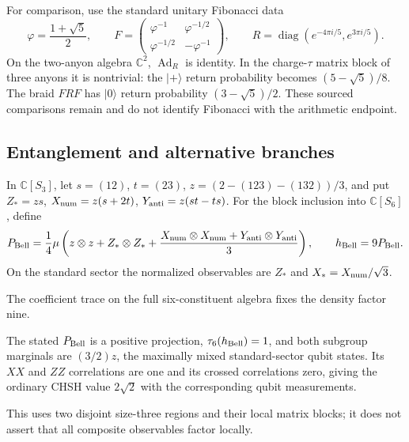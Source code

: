 For comparison, use the standard unitary Fibonacci data
\[
\varphi=\frac{1+\sqrt5}{2},\qquad
F=\begin{pmatrix}\varphi^{-1}&\varphi^{-1/2}\\
\varphi^{-1/2}&-\varphi^{-1}\end{pmatrix},\qquad
R=\operatorname{diag}(e^{-4\pi i/5},e^{3\pi i/5}).
\]
On the two-anyon algebra $\mathbb C^2$, $\operatorname{Ad}_R$ is identity.
In the charge-$\tau$ matrix block of three anyons it is nontrivial:
the $|+\rangle$ return probability becomes $(5-\sqrt5)/8$.
The braid $FRF$ has $|0\rangle$ return probability $(3-\sqrt5)/2$.
These sourced comparisons remain \statusSketch{} and do not identify
Fibonacci with the arithmetic endpoint.

\subsection{Entanglement and alternative branches}

\begin{definition}
In $\mathbb C[S_3]$, let $s=(12)$, $t=(23)$,
$z=(2-(123)-(132))/3$, and put
$Z_*=zs$, $X_{\rm num}=z(s+2t)$, $Y_{\rm anti}=z(st-ts)$.
For the block inclusion into $\mathbb C[S_6]$, define
\[
P_{\rm Bell}=\frac14\mu\left(
z\otimes z+Z_*\otimes Z_*+
\frac{X_{\rm num}\otimes X_{\rm num}+Y_{\rm anti}\otimes Y_{\rm anti}}3
\right),\qquad h_{\rm Bell}=9P_{\rm Bell}.
\]
On the standard sector the normalized observables are $Z_*$ and
$X_*=X_{\rm num}/\sqrt3$.
\end{definition}
\begin{scope}The coefficient trace on the full six-constituent algebra
fixes the density factor nine.\end{scope}

\begin{proposition}
{\normalfont\statusSketch}\quad The stated $P_{\rm Bell}$ is a positive
projection, $\tau_6(h_{\rm Bell})=1$, and both subgroup marginals are
$(3/2)z$, the maximally mixed standard-sector qubit states. Its $XX$ and
$ZZ$ correlations are one and its crossed correlations zero, giving the
ordinary CHSH value $2\sqrt2$ with the corresponding qubit measurements.
\end{proposition}
\begin{scope}This uses two disjoint size-three regions and their local
matrix blocks; it does not assert that all composite observables factor locally.\end{scope}

